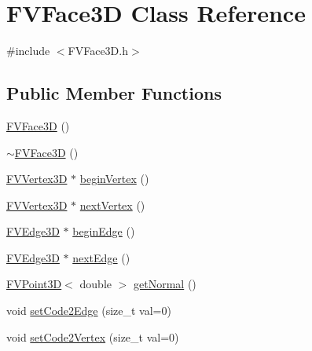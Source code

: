 \hypertarget{classFVFace3D}{
\section{FVFace3D Class Reference}
\label{de/df5/classFVFace3D}
}


{\ttfamily \#include $<$FVFace3D.h$>$}

\subsection*{Public Member Functions}
\begin{DoxyCompactItemize}
\item 
\hyperlink{classFVFace3D_af9501b4ab6a48512f589a981e547a138}{FVFace3D} ()
\item 
\hyperlink{classFVFace3D_a82460c8f716bdb29e5b3990e8bf9b972}{$\sim$FVFace3D} ()
\item 
\hyperlink{classFVVertex3D}{FVVertex3D} $\ast$ \hyperlink{classFVFace3D_a00e03dd7e67cf78d0d00487e52394451}{beginVertex} ()
\item 
\hyperlink{classFVVertex3D}{FVVertex3D} $\ast$ \hyperlink{classFVFace3D_a936762a7544b61fc2a7bf156a3394d28}{nextVertex} ()
\item 
\hyperlink{classFVEdge3D}{FVEdge3D} $\ast$ \hyperlink{classFVFace3D_aa5375d5ffa663cdd69ade5bc63928201}{beginEdge} ()
\item 
\hyperlink{classFVEdge3D}{FVEdge3D} $\ast$ \hyperlink{classFVFace3D_a67d59b9d682de14593cbd6c930acaaef}{nextEdge} ()
\item 
\hyperlink{classFVPoint3D}{FVPoint3D}$<$ double $>$ \hyperlink{classFVFace3D_a748535152afdb832cb615c717ea08f62}{getNormal} ()
\item 
void \hyperlink{classFVFace3D_a9e25d24a18a62921eff34d38f8b1b896}{setCode2Edge} (size\_\-t val=0)
\item 
void \hyperlink{classFVFace3D_a0a47b3287cfccb79cba1552f3ad1e7b9}{setCode2Vertex} (size\_\-t val=0)
\end{DoxyCompactItemize}
